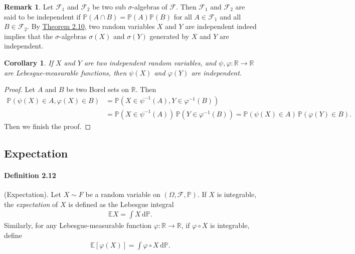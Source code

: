 \documentclass{article}
\numberwithin{equation}{section}
\newcommand{\E}{\mathbb{E}}
\renewcommand{\P}{\mathbb{P}}
\renewcommand{\d}{\mathrm{d}}
\theoremstyle{plain}
\newtheorem{corollary}[theorem]{Corollary}
\theoremstyle{definition}
\newtheorem*{remark}{Remark}
\begin{document}
\begin{remark} Let $\mathscr{F}_1$ and $\mathscr{F}_2$ be two sub $\sigma$-algebras of $\mathscr{F}$. Then $\mathscr{F}_1$ and $\mathscr{F}_2$ are said to be independent if $\mathbb{P}(A\cap B)=\mathbb{P}(A)\mathbb{P}(B)$ for all $A\in\mathscr{F}_1$ and all $B\in\mathscr{F}_2$.  By \hyperref[thm:2.10]{Theorem 2.10}, two random variables $X$ and $Y$ are independent indeed implies that the $\sigma$-algebras $\sigma(X)$ and $\sigma(Y)$ generated by $X$ and $Y$ are independent.
\end{remark}
\begin{corollary}\label{cor:2.11} If $X$ and $Y$ are two independent random variables, and $\psi,\varphi:\mathbb{R}\to\mathbb{R}$ are Lebesgue-measurable functions, then $\psi(X)$ and $\varphi(Y)$ are independent.
\end{corollary}
\begin{proof}
Let $A$ and $B$ be two Borel sets on $\mathbb{R}$. Then
\begin{align*}
	\P(\psi(X)\in A,\varphi(X)\in B) &= \P(X\in\psi^{-1}(A),Y\in\varphi^{-1}(B))\\
	&= \P(X\in\psi^{-1}(A))\,\P(Y\in\varphi^{-1}(B)) = \P(\psi(X)\in A)\,\P(\varphi(Y)\in B).
\end{align*}
Then we finish the proof.
\end{proof}
\newpage
\subsection{Expectation}
\paragraph{Definition 2.12\label{def:2.12}} (Expectation). Let $X\sim F$ be a random variable on $(\Omega,\mathscr{F},\mathbb{P})$. If $X$ is integrable, the \textit{expectation} of $X$ is defined as the Lebesgue integral
\begin{align*}
	\E X = \int X\,\d \P.
\end{align*}
Similarly, for any Lebesgue-measurable function $\varphi:\mathbb{R}\to\mathbb{R}$, if $\varphi\circ X$ is integrable, define
\begin{align*}
	\E[\varphi(X)] = \int \varphi\circ X\,\d \P.
\end{align*}
\end{document}
